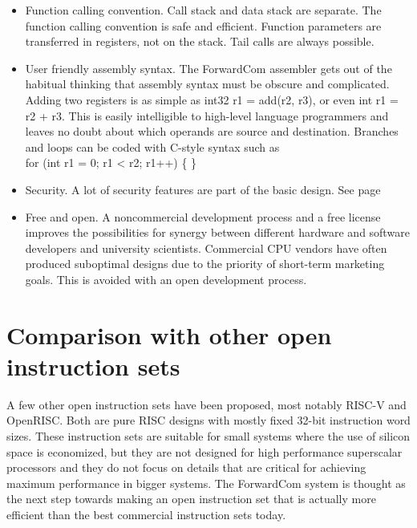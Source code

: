 \documentclass[forwardcom.tex]{subfiles}
\begin{document}
\begin{itemize}
\item Function calling convention. Call stack and data stack are separate. The function calling convention is safe and efficient. Function parameters are transferred in registers, not on the stack. Tail calls are always possible.

\item User friendly assembly syntax. The ForwardCom assembler gets out of the habitual thinking that assembly syntax must be obscure and complicated. Adding two registers is as simple as {\ttfamily int32 r1 = add(r2, r3)}, or even {\ttfamily int r1 = r2 + r3}. This is easily intelligible to high-level language programmers and leaves no doubt about which operands are source and destination. 
Branches and loops can be coded with C-style syntax such as \\
{\ttfamily for (int r1 = 0; r1 < r2; r1++) \{  \} }

\item Security. A lot of security features are part of the basic design. 
See page \pageref{securityFeatures}

\item Free and open. A noncommercial development process and a free license improves the possibilities for synergy between different hardware and software developers and university scientists. Commercial CPU vendors have often produced suboptimal designs due to the priority of short-term marketing goals. This is avoided with an open development process.

\end{itemize}
\vv


\section{Comparison with other open instruction sets}
A few other open instruction sets have been proposed, most notably RISC-V and OpenRISC. Both are pure RISC designs with mostly fixed 32-bit instruction word sizes. These instruction sets are suitable for small systems where the use of silicon space is economized, but they are not designed for high performance superscalar processors and they do not focus on details that are critical for achieving maximum performance in bigger systems. The ForwardCom system is thought as the next step towards making an open instruction set that is actually more efficient than the best commercial instruction sets today.
\vv
\end{document}
